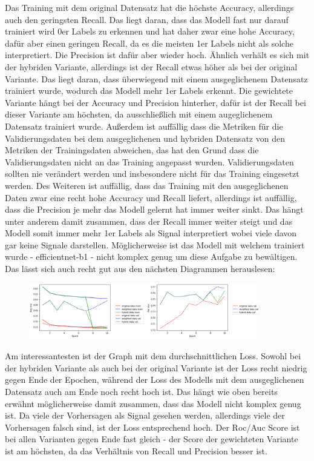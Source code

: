 \documentclass[11pt, a4paper]{article}
\begin{document}
Das Training mit dem original Datensatz hat die höchste Accuracy, allerdings auch den geringsten Recall. Das liegt daran, dass das Modell fast nur darauf trainiert wird 0er Labels zu erkennen und hat daher zwar eine hohe Accuracy, dafür aber einen geringen Recall, da es die meisten 1er Labels nicht als solche interpretiert. Die Precision ist dafür aber wieder hoch. Ähnlich verhält es sich mit der hybriden Variante, allerdings ist der Recall etwas höher als bei der original Variante. Das liegt daran, dass überwiegend mit einem ausgeglichenem Datensatz trainiert wurde, wodurch das Modell mehr 1er Labels erkennt. Die gewichtete Variante hängt bei der Accuracy und Precision hinterher, dafür ist der Recall bei dieser Variante am höchsten, da ausschließlich mit einem augeglichenem Datensatz trainiert wurde. Außerdem ist auffällig dass die Metriken für die Validierungsdaten bei dem ausgeglichenen und hybriden Datensatz von den Metriken der Trainingsdaten abweichen, das hat den Grund dass die Validierungsdaten nicht an das Training angepasst wurden. Validierungsdaten sollten nie verändert werden und insbesondere nicht für das Training eingesetzt werden. Des Weiteren ist auffällig, dass das Training mit den ausgeglichenen Daten zwar eine recht hohe Accuracy und Recall liefert, allerdings ist auffällig, dass die Precision je mehr das Modell gelernt hat immer weiter sinkt. Das hängt unter anderem damit zusammen, dass der Recall immer weiter steigt und das Modell somit immer mehr 1er Labels als Signal interpretiert wobei viele davon gar keine Signale darstellen. Möglicherweise ist das Modell mit welchem trainiert wurde - efficientnet-b1 - nicht komplex genug um diese Aufgabe zu bewältigen. Das lässt sich auch recht gut aus den nächsten Diagrammen herauslesen:
\begin{figure}[h]
\centering
\includegraphics[width=0.9\textwidth]{metrics-avgloss-rocauc.png}
\end{figure}
Am interessantesten ist der Graph mit dem durchschnittlichen Loss. Sowohl bei der hybriden Variante als auch bei der original Variante ist der Loss recht niedrig gegen Ende der Epochen, während der Loss des Modells mit dem ausgeglichenen Datensatz auch am Ende noch recht hoch ist. Das hängt wie oben bereits erwähnt möglicherweise damit zusammen, dass das Modell nicht komplex genug ist. Da viele der Vorhersagen als Signal gesehen werden, allerdings viele der Vorhersagen falsch sind, ist der Loss entsprechend hoch. Der Roc/Auc Score ist bei allen Varianten gegen Ende fast gleich - der Score der gewichteten Variante ist am höchsten, da das Verhältnis von Recall und Precision besser ist.
\end{document}
